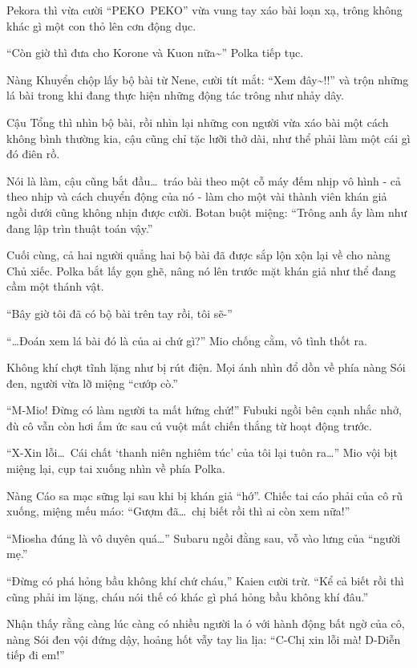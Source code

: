 \documentclass[../main.tex]{subfiles}
\begin{document}
Pekora thì vừa cười ``PEKO\uparrow\ PEKO\downarrow'' vừa vung tay xáo bài loạn xạ, trông không khác gì một con thỏ lên cơn động dục.

``Còn giờ thì đưa cho Korone và Kuon nữa\~{}'' Polka tiếp tục.

Nàng Khuyển chộp lấy bộ bài từ Nene, cười tít mắt: ``Xem đây\~{}!!'' và trộn những lá bài trong khi đang thực hiện những động tác trông như nhảy dây.

Cậu Tổng thì nhìn bộ bài, rồi nhìn lại những con người vừa xáo bài một cách không bình thường kia, cậu cũng chỉ tặc lưỡi thở dài, như thể phải làm một cái gì đó điên rồ.

Nói là làm, cậu cũng bắt đầu\dots\ tráo bài theo một cỗ máy đếm nhịp vô hình - cả theo nhịp và cách chuyển động của nó - làm cho một vài thành viên khán giả ngồi dưới cũng không nhịn được cười. Botan buột miệng: ``Trông anh ấy làm như đang lập trìn thuật toán vậy.''

Cuối cùng, cả hai người quẳng hai bộ bài đã được sắp lộn xộn lại về cho nàng Chủ xiếc. Polka bắt lấy gọn ghẽ, nâng nó lên trước mặt khán giả như thể đang cầm một thánh vật.

``Bây giờ tôi đã có bộ bài trên tay rồi, tôi sẽ-''

``\dots Đoán xem lá bài đó là của ai chứ gì?'' Mio chống cằm, vô tình thốt ra.

Không khí chợt tĩnh lặng như bị rút điện. Mọi ánh nhìn đổ dồn về phía nàng Sói đen, người vừa lỡ miệng ``cướp cò.''

``M-Mio! Đừng có làm người ta mất hứng chứ!'' Fubuki ngồi bên cạnh nhắc nhở, đù cô vẫn còn hơi ấm ức sau cú vuột mất chiến thắng từ hoạt động trước.

``X-Xin lỗi\dots\ Cái chất `thanh niên nghiêm túc' của tôi lại tuôn ra\dots'' Mio vội bịt miệng lại, cụp tai xuống nhìn về phía Polka.

Nàng Cáo sa mạc sững lại sau khi bị khán giả ``hớ''. Chiếc tai cáo phải của cô rũ xuống, miệng mếu máo: ``Gượm đã\dots\ chị biết rồi thì ai còn xem nữa!''

``Miosha đúng là vô duyên quá\dots'' Subaru ngồi đằng sau, vỗ vào lưng của ``người mẹ.''

``Đừng có phá hỏng bầu không khí chứ cháu,'' Kaien cười trừ. ``Kể cả biết rồi thì cũng phải im lặng, cháu nói thế có khác gì phá hỏng bầu không khí đâu.''

Nhận thấy rằng càng lúc càng có nhiều người la ó với hành động bất ngờ của cô, nàng Sói đen vội đứng dậy, hoảng hốt vẫy tay lia lịa: ``C-Chị xin lỗi mà! D-Diễn tiếp đi em!''
\end{document}
